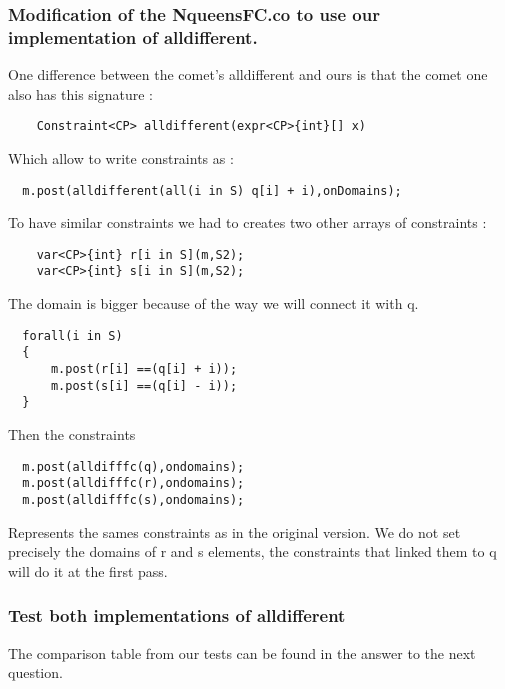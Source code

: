 \documentclass{eplDoc}
\begin{document}
\subsubsection{Modification of the NqueensFC.co to use our implementation of alldifferent.}
One difference between the comet's alldifferent and ours is that the comet one also has this signature :
\begin{lstlisting}
    Constraint<CP> alldifferent(expr<CP>{int}[] x)
\end{lstlisting}
Which allow to write constraints as :
\begin{lstlisting}
  m.post(alldifferent(all(i in S) q[i] + i),onDomains);
\end{lstlisting}
To have similar constraints we had to creates two other arrays of constraints :
 \begin{lstlisting}
    var<CP>{int} r[i in S](m,S2);
    var<CP>{int} s[i in S](m,S2);
 \end{lstlisting}
The domain is bigger because of the way we will connect it with q.
\begin{lstlisting}
  forall(i in S)
  {
      m.post(r[i] ==(q[i] + i));
      m.post(s[i] ==(q[i] - i));
  } 
\end{lstlisting}
Then the constraints
\begin{lstlisting}
  m.post(alldifffc(q),ondomains);
  m.post(alldifffc(r),ondomains);
  m.post(alldifffc(s),ondomains);
\end{lstlisting}
Represents the sames constraints as in the original version.  We do not set precisely the domains of r and s elements, the constraints that linked them to q will do it at the first pass.

\subsubsection{Test both implementations of alldifferent}

The comparison table from our tests can be found in the answer to the next question. 
\end{document}

